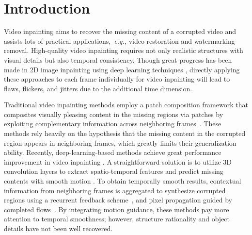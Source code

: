

\section{Introduction}


Video inpainting aims to recover the missing content of a corrupted video and assists lots of practical applications,~\emph{e.g.,} video restoration and watermarking removal. 
High-quality video inpainting requires not only realistic structures with visual details but also temporal consistency. 
% 
Though great progress has been made in 2D image inpainting using deep learning techniques \cite{yu2018free,Xiong_2019_CVPR,wang2018high}, directly applying these approaches to each frame individually for video inpainting will lead to flaws, flickers, and jitters due to the additional time dimension. 





Traditional video inpainting methods employ a patch composition framework that composites visually pleasing content in the missing regions via patches by exploiting complementary information across neighboring frames~\cite{patwardhan2007video,wexler2004space,newson2014video}.
% 
These methods rely heavily on the hypothesis that the missing content in the corrupted region appears in neighboring frames, which greatly limits their generalization ability.
%
Recently, deep-learning-based methods achieve great performance improvement in video inpainting \cite{wang2019video,Kim_2019_CVPR1,Xu_2019_CVPR,Kim_2019_CVPR,lee2019copy,oh2019onion}.
A straightforward solution is to utilize 3D convolution layers to extract spatio-temporal features and predict missing contents with smooth motion \cite{wang2019video}.
To obtain temporally smooth results, contextual information from neighboring frames is aggregated to synthesize corrupted regions using a recurrent feedback scheme~\cite{Kim_2019_CVPR1,Kim_2019_CVPR}, and pixel propagation guided by completed flows~\cite{Xu_2019_CVPR}. 
By integrating motion guidance, these methods pay more attention to temporal smoothness; however, structure rationality and object details have not been well recovered. 



